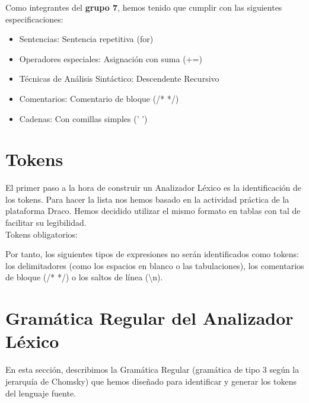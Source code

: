 \documentclass{article}
\begin{document}
Como integrantes del \textbf{grupo 7}, hemos tenido que cumplir con las siguientes especificaciones: 
\begin{itemize}[left=2cm]
    \item Sentencias: Sentencia repetitiva (for)
    \item Operadores especiales: Asignación con suma (+=)
    \item Técnicas de Análisis Sintáctico: Descendente Recursivo
    \item Comentarios: Comentario de bloque (/* */)
    \item Cadenas: Con comillas simples (' ')
\end{itemize}


\newpage

\section{Tokens}
El primer paso a la hora de construir un Analizador Léxico es la identificación de los tokens. Para hacer la lista nos hemos basado en la actividad práctica de la plataforma Draco. Hemos decidido utilizar el mismo formato en tablas con tal de facilitar su legibilidad.\\
Tokens obligatorios:



Por tanto, los siguientes tipos de expresiones no serán identificados como tokens: los delimitadores (como los espacios en blanco o las tabulaciones), los comentarios de bloque (/* */) o los saltos de línea (\textbackslash n).

\section{Gramática Regular del Analizador Léxico}

En esta sección, describimos la Gramática Regular (gramática de tipo 3 según la jerarquía de Chomsky) que hemos diseñado para identificar y generar los tokens del lenguaje fuente. 
\end{document}
